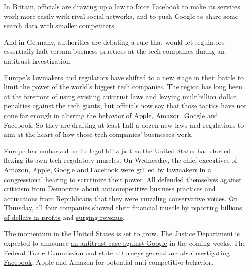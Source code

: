 In Britain, officials are drawing up a law to force Facebook to make its
services work more easily with rival social networks, and to push Google
to share some search data with smaller competitors.

And in Germany, authorities are debating a rule that would let
regulators essentially halt certain business practices at the tech
companies during an antitrust investigation.

Europe's lawmakers and regulators have shifted to a new stage in their
battle to limit the power of the world's biggest tech companies. The
region has long been at the forefront of using existing antitrust laws
and
\href{https://www.nytimes3xbfgragh.onion/2018/07/18/technology/google-eu-android-fine.html}{levying
multibillion dollar penalties} against the tech giants, but officials
now say that those tactics have not gone far enough in altering the
behavior of Apple, Amazon, Google and Facebook. So they are drafting at
least half a dozen new laws and regulations to aim at the heart of how
those tech companies' businesses work.

Europe has embarked on its legal blitz just as the United States has
started flexing its own tech regulatory muscles. On Wednesday, the chief
executives of Amazon, Apple, Google and Facebook were grilled by
lawmakers in a
\href{https://www.nytimes3xbfgragh.onion/2020/07/28/technology/amazon-apple-facebook-google-antitrust-hearing.html?action=click\&module=Top\%20Stories\&pgtype=Homepage}{congressional
hearing to scrutinize their power}. All
\href{https://www.nytimes3xbfgragh.onion/live/2020/07/29/technology/tech-ceos-hearing-testimony}{defended
themselves against criticism} from Democrats about anticompetitive
business practices and accusations from Republicans that they were
muzzling conservative voices. On Thursday, all four companies
\href{https://www.nytimes3xbfgragh.onion/live/2020/07/30/business/stock-market-today-coronavirus/amazons-earnings-double-as-sales-surge}{showed
their financial muscle} by reporting
\href{https://www.nytimes3xbfgragh.onion/live/2020/07/30/business/stock-market-today-coronavirus/apple-blows-past-expectations-with-surging-sales-and-profits}{billions
of dollars in profits} and
\href{https://www.nytimes3xbfgragh.onion/live/2020/07/30/business/stock-market-today-coronavirus/facebook-nearly-doubles-its-profit-but-warns-of-fallout-from-ad-boycotts}{surging
revenue}.

The momentum in the United States is set to grow. The Justice Department
is expected to announce
\href{https://www.nytimes3xbfgragh.onion/2020/05/15/technology/google-antitrust-investigation.html}{an
antitrust case against Google} in the coming weeks. The Federal Trade
Commission and state attorneys general are
also\href{https://www.nytimes3xbfgragh.onion/2020/07/17/technology/ftc-facebook-investigation.html}{investigating
Facebook}, Apple and Amazon for potential anti-competitive behavior.

